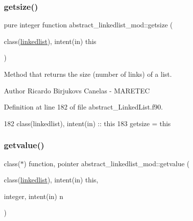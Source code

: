 \subsubsection{\texorpdfstring{getsize()}{getsize()}}
{\footnotesize\ttfamily pure integer function abstract\+\_\+linkedlist\+\_\+mod\+::getsize (\begin{DoxyParamCaption}\item[{class(\mbox{\hyperlink{structabstract__linkedlist__mod_1_1linkedlist}{linkedlist}}), intent(in)}]{this }\end{DoxyParamCaption})\hspace{0.3cm}{\ttfamily [private]}}



Method that returns the size (number of links) of a list. 

\begin{DoxyAuthor}{Author}
Ricardo Birjukovs Canelas -\/ M\+A\+R\+E\+T\+EC 
\end{DoxyAuthor}


Definition at line 182 of file abstract\+\_\+\+Linked\+List.\+f90.


\begin{DoxyCode}
182     \textcolor{keywordtype}{class}(linkedlist), \textcolor{keywordtype}{intent(in)} :: this
183     getsize = this%
\end{DoxyCode}
\mbox{\label{namespaceabstract__linkedlist__mod_a3c3ad627fd9f87da9831c53802975104}} 
\subsubsection{\texorpdfstring{getvalue()}{getvalue()}}
{\footnotesize\ttfamily class($\ast$) function, pointer abstract\+\_\+linkedlist\+\_\+mod\+::getvalue (\begin{DoxyParamCaption}\item[{class(\mbox{\hyperlink{structabstract__linkedlist__mod_1_1linkedlist}{linkedlist}}), intent(in)}]{this,  }\item[{integer, intent(in)}]{n }\end{DoxyParamCaption})\hspace{0.3cm}{\ttfamily [private]}}



